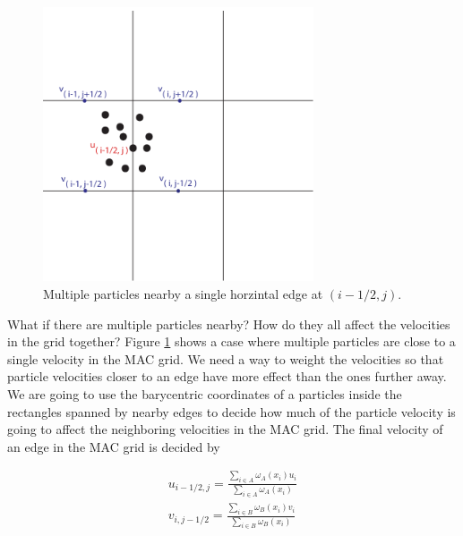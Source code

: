 \begin{figure}[ht!]
\centering
\includegraphics[width=80mm]{img/transfer2.pdf}
\caption{Multiple particles nearby a single horzintal edge at $(i-1/2,j)$.}
\label{fouredge}
\end{figure}
\newline
\newline
\noindent
What if there are multiple particles nearby? How do they all affect the velocities in the grid together? Figure \ref{fouredge} shows a case where multiple particles are close to a single velocity in the MAC grid. We need a way to weight the velocities so that particle velocities closer to an edge have more effect than the ones further away. We are going to use the barycentric coordinates of a particles inside the rectangles spanned by nearby edges to decide how much of the particle velocity is going to affect the neighboring velocities in the MAC grid. The final velocity of an edge in the MAC grid is decided by

\begin{eqnarray}
u_{i-1/2,j} = \frac{\sum\limits_{i\in A}\omega_A(x_i) u_{i}}{\sum\limits_{i \in A}\omega_A(x_i)} \\
v_{i,j-1/2} = \frac{ \sum\limits_{i \in B}\omega_B(x_i) v_{i}}{\sum\limits_{i \in B}\omega_B(x_i)}
\label{weightsums}
\end{eqnarray}

